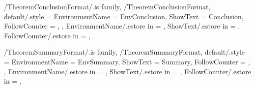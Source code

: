 
\pgfkeys
{
  /TheoremConclusionFormat/.is family, /TheoremConclusionFormat,
  default/.style =
  {
    EnvironmentName = {EnvConclusion},
    ShowText = {Conclusion},
    FollowCounter = \empty,
  },
  EnvironmentName/.estore in = \GetTheoremConclusionFormatEnvironmentName,
  ShowText/.estore in = \GetTheoremConclusionFormatShowText,
  FollowCounter/.estore in = \GetTheoremConclusionFormatFollowCounter,
} %

\newcommand{\InsertConclusion}[1]
{%
  \InsertTheoremContent[\empty]{%
    \GetTheoremConclusionFormatEnvironmentName}{#1}%
} %

\newcommand{\InitTheoremConclusionFormat}
{%
  \theoremstyle{definition}%
  \ifthenelse{\equal{\GetTheoremConclusionFormatFollowCounter}{\empty}}%
  {%
    \newtheorem*{%
      \GetTheoremConclusionFormatEnvironmentName}{%
      \GetTheoremConclusionFormatShowText}
  }%
  {%
    \MappingTheoremCounter[Conclusion]{\GetTheoremConclusionFormatFollowCounter}%
    \newtheorem{%
      \GetTheoremConclusionFormatEnvironmentName}{%
      \GetTheoremConclusionFormatShowText}[%
      \GetTheoremConclusionFormatFollowCounter]%
  }%
} %


\pgfkeys
{
  /TheoremSummaryFormat/.is family, /TheoremSummaryFormat,
  default/.style =
  {
    EnvironmentName = {EnvSummary},
    ShowText = {Summary},
    FollowCounter = \empty,
  },
  EnvironmentName/.estore in = \GetTheoremSummaryFormatEnvironmentName,
  ShowText/.estore in = \GetTheoremSummaryFormatShowText,
  FollowCounter/.estore in = \GetTheoremSummaryFormatFollowCounter,
} %

\newcommand{\InsertSummary}[1]
{%
  \InsertTheoremContent[\empty]{%
    \GetTheoremSummaryFormatEnvironmentName}{#1}%
} %

\newcommand{\InitTheoremSummaryFormat}
{%
  \theoremstyle{definition}%
  \ifthenelse{\equal{\GetTheoremSummaryFormatFollowCounter}{\empty}}%
  {%
    \newtheorem*{%
      \GetTheoremSummaryFormatEnvironmentName}{%
      \GetTheoremSummaryFormatShowText}
  }%
  {%
    \MappingTheoremCounter[Summary]{\GetTheoremSummaryFormatFollowCounter}%
    \newtheorem{%
      \GetTheoremSummaryFormatEnvironmentName}{%
      \GetTheoremSummaryFormatShowText}[%
      \GetTheoremSummaryFormatFollowCounter]%
  }%
} %

